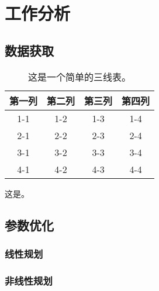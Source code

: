 \chapter{工作分析}

\section{数据获取}

\begin{table}[htbp]
    \centering
    \caption{这是一个简单的三线表。}
    \label{tab:testtable}
    \setlength{\tabcolsep}{0.6cm}
    \begin{tabular}{cccc}
        \toprule
        第一列 & 第二列 & 第三列 & 第四列 \\
        \midrule
        1-1 & 1-2 & 1-3 & 1-4 \\
        2-1 & 2-2 & 2-3 & 2-4 \\
        3-1 & 3-2 & 3-3 & 3-4 \\
        4-1 & 4-2 & 4-3 & 4-4 \\
        \bottomrule
    \end{tabular}
\end{table}

这是。

\section{参数优化}

\subsection{线性规划}

\subsection{非线性规划}

